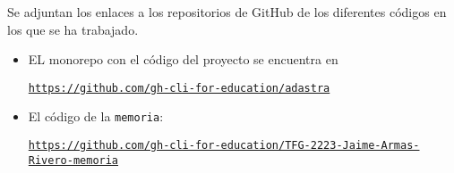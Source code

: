 Se adjuntan los enlaces a los repositorios de GitHub de los diferentes códigos en los que se ha trabajado.

\begin{itemize}
  \item 
  EL monorepo con el código del proyecto se encuentra en

  \href{https://github.com/gh-cli-for-education/adastra}{{\tt https://github.com/gh-cli-for-education/adastra}}

  \item 
  El código de la \verb|memoria|:

  \href{https://github.com/gh-cli-for-education/TFG-2223-Jaime-Armas-Rivero-memoria}{{\tt https://github.com/gh-cli-for-education/TFG-2223-Jaime-Armas-Rivero-memoria}}
  
  
\end{itemize}